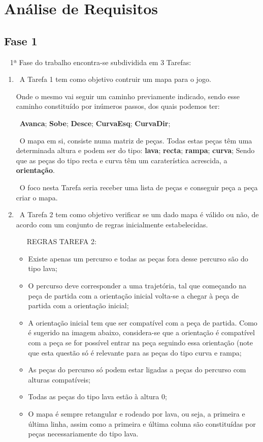 \documentclass[a4paper]{report} %
\begin{document}
\chapter{Análise de Requisitos}


\section{Fase 1}
\label{sec:analisefase1}

\ { 1ª Fase do trabalho encontra-se subdividida em 3 Tarefas:} 
  \begin{enumerate}
        \item  \ A Tarefa 1 tem como objetivo contruir um mapa para o jogo. 
        \par Onde o mesmo vai seguir um caminho previamente indicado, sendo esse caminho constituído por inúmeros passos, dos quais podemos ter: 
        \par  \ \textbf{Avanca}; \textbf{Sobe}; \textbf{Desce}; \textbf{CurvaEsq}; \textbf{CurvaDir};              
        \par  \ O mapa em si, consiste numa matriz de peças. Todas estas peças têm uma determinada altura e podem ser do tipo: \textbf{lava}; \textbf{recta}; \textbf{rampa}; \textbf{curva}; Sendo que as peças do tipo recta e curva têm um caraterística acrescida, a \textbf{orientação}.
        \par   \ O foco nesta Tarefa seria receber uma lista de peças e conseguir peça a peça criar o mapa.
        
        \item  \ A Tarefa 2 tem como objetivo verificar se um dado mapa é válido ou não, de acordo com um conjunto de regras inicialmente estabelecidas. 
        \par \ \ \ REGRAS TAREFA 2:
            \begin{itemize}
                \item \small{Existe apenas um percurso e todas as peças fora desse percurso são do tipo lava;}
                \item  \small{O percurso deve corresponder a uma trajetória, tal que começando na peça de partida com a orientação inicial volta-se a chegar à peça de partida com a orientação inicial;}
                \item \small{A orientação inicial tem que ser compatível com a peça de partida. Como é sugerido na imagem abaixo, considera-se que a orientação é compatível com a peça se for possível entrar na peça seguindo essa orientação (note que esta questão só é relevante para as peças do tipo curva e rampa;}
                \item  \small{As peças do percurso só podem estar ligadas a peças do percurso com alturas compatíveis;} 
                \item  \small{Todas as peças do tipo lava estão à altura 0;}
                \item  \small{O mapa é sempre retangular e rodeado por lava, ou seja, a primeira e última linha, assim como a primeira e última coluna são constituídas por peças necessariamente do tipo lava.}
            \end{itemize}
            

\end{enumerate}
\end{document}
